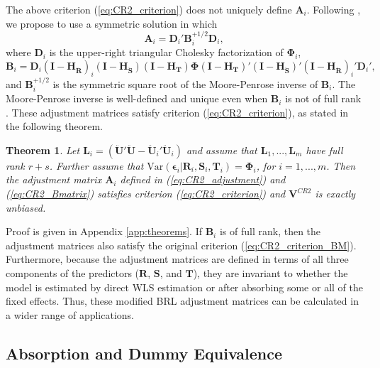\documentclass[12pt]{article}\usepackage[]{graphicx}\usepackage[]{color}
\newtheorem{thm}{Theorem}
\newcommand{\Var}{\text{Var}}
\newcommand{\bm}{\mathbf}
\newcommand{\bs}{\boldsymbol}
\begin{document}
The above criterion (\ref{eq:CR2_criterion}) does not uniquely define $\bm{A}_i$. Following \citet{McCaffrey2001generalizations}, we propose to use a symmetric solution in which
\begin{equation}
\label{eq:CR2_adjustment}
\bm{A}_i = \bm{D}_i' \bm{B}_i^{+1/2} \bm{D}_i,
\end{equation}
where $\bm{D}_i$ is the upper-right triangular Cholesky factorization of $\bs\Phi_i$, 
\begin{equation}
\label{eq:CR2_Bmatrix}
\bm{B}_i = \bm{D}_i\left(\bm{I} - \bm{H_{\ddot{R}}}\right)_i \left(\bm{I} - \bm{H_{\ddot{S}}}\right) \left(\bm{I} - \bm{H_T}\right) \bs\Phi \left(\bm{I} - \bm{H_T}\right)' \left(\bm{I} - \bm{H_{\ddot{S}}}\right)' \left(\bm{I} - \bm{H_{\ddot{R}}}\right)_i' \bm{D}_i',
\end{equation}
and $\bm{B}_i^{+1/2}$ is the symmetric square root of the Moore-Penrose inverse of $\bm{B}_i $. 
The Moore-Penrose inverse is well-defined and unique even when $\bm{B}_i$ is not of full rank \citep[][Thm. 9.18]{Banerjee2014linear}. These adjustment matrices satisfy criterion (\ref{eq:CR2_criterion}), as stated in the following theorem.

\begin{thm}
\label{thm:BRL_FE}
Let $\bm{L}_i = \left(\bm{\ddot{U}}'\bm{\ddot{U}} - \bm{\ddot{U}}_i'\bm{\ddot{U}}_i\right)$ and assume that $\bm{L}_1,...,\bm{L}_m$ have full rank $r + s$. Further assume that $\Var\left(\bs\epsilon_i\left|\bm{R}_i,\bm{S}_i,\bm{T}_i\right.\right) = \bs\Phi_i$, for $i = 1,...,m$. Then the adjustment matrix $\bm{A}_i$ defined in (\ref{eq:CR2_adjustment}) and (\ref{eq:CR2_Bmatrix}) satisfies criterion (\ref{eq:CR2_criterion}) and $\bm{V}^{CR2}$ is exactly unbiased.
\end{thm}

Proof is given in Appendix \ref{app:theorems}. If $\bm{B}_i$ is of full rank, then the adjustment matrices also satisfy the original criterion (\ref{eq:CR2_criterion_BM}). Furthermore, because the adjustment matrices are defined in terms of all three components of the predictors ($\bm{R}$, $\bm{S}$, and $\bm{T}$), they are invariant to whether the model is estimated by direct WLS estimation or after absorbing some or all of the fixed effects. 
Thus, these modified BRL adjustment matrices can be calculated in a wider range of applications.

\subsection{Absorption and Dummy Equivalence}
\end{document}
